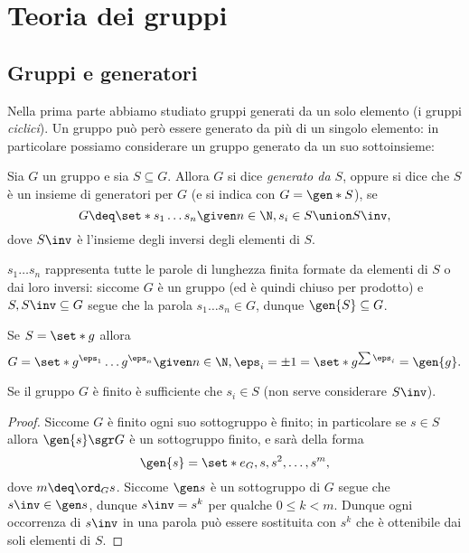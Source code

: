 \chapter{Teoria dei gruppi}

\section{Gruppi e generatori}

Nella prima parte abbiamo studiato gruppi generati da un solo elemento (i gruppi \emph{ciclici}). Un gruppo può però essere generato da più di un singolo elemento: in particolare possiamo considerare un gruppo generato da un suo sottoinsieme:

\begin{definition}
    Sia $G$ un gruppo e sia $S \subseteq G$. Allora $G$ si dice \emph{generato da $S$}, oppure si dice che $S$ è un insieme di generatori per $G$ (e si indica con $G = \gen*{S}$), se \[
        G \deq \set*{s_1\dots s_n \given n \in \N, s_i \in S \union S\inv},
    \] dove $S\inv$ è l'insieme degli inversi degli elementi di $S$.
\end{definition}

\begin{remark}
    $s_1 \dots s_n$ rappresenta tutte le parole di lunghezza finita formate da elementi di $S$ o dai loro inversi: siccome $G$ è un gruppo (ed è quindi chiuso per prodotto) e $S, S\inv \subseteq G$ segue che la parola $s_1 \dots s_n \in G$, dunque $\gen{S} \subseteq G$.
\end{remark}

\begin{remark}
    Se $S = \set*{g}$ allora \[
        G = \set*{g^{\eps_1}\dots g^{\eps_n} \given n \in \N, \eps_i = \pm 1} = \set*{g^{\sum \eps_i}} = \gen{g}.
    \]
\end{remark}

\begin{remark}
    Se il gruppo $G$ è finito è sufficiente che $s_i \in S$ (non serve considerare $S\inv$).
    \begin{proof}
        Siccome $G$ è finito ogni suo sottogruppo è finito; in particolare se $s \in S$ allora $\gen{s} \sgr G$ è un sottogruppo finito, e sarà della forma \[
            \gen{s} = \set*{e_G, s, s^2, \dots, s^m},    
        \] dove $m \deq \ord_{G}{s}$.
        Siccome $\gen s$ è un sottogruppo di $G$ segue che $s\inv \in \gen s$, dunque $s\inv = s^k$ per qualche $0 \leq k < m$.
        Dunque ogni occorrenza di $s\inv$ in una parola può essere sostituita con $s^k$ che è ottenibile dai soli elementi di $S$. 
    \end{proof}
\end{remark}

